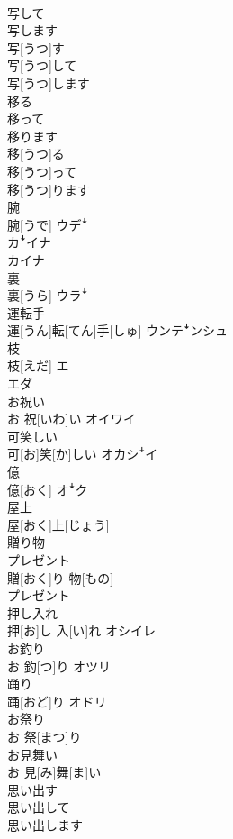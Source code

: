 \documentclass[8pt]{extreport}
\begin{document}
\begin{CJK}{UTF8}{min}
\\	写して 
\\	写します	
\\	写[うつ]す 
\\	写[うつ]して 
\\	写[うつ]します	
\\	移る 
\\	移って 
\\	移ります	
\\	移[うつ]る 
\\	移[うつ]って 
\\	移[うつ]ります	
\\	腕	
\\	腕[うで]	ウデꜜ 
\\	カꜜイナ 
\\	カイナ
\\	裏	
\\	裏[うら]	ウラꜜ
\\	運転手	
\\	運[うん]転[てん]手[しゅ]	ウンテꜜンシュ
\\	枝	
\\	枝[えだ]	エ 
\\	エダ
\\	お祝い	
\\	お 祝[いわ]い	オイワイ
\\	可笑しい	
\\	可[お]笑[か]しい	オカシꜜイ
\\	億	
\\	億[おく]	オꜜク
\\	屋上	
\\	屋[おく]上[じょう]	
\\	贈り物 
\\	プレゼント	
\\	贈[おく]り 物[もの] 
\\	プレゼント	
\\	押し入れ	
\\	押[お]し 入[い]れ	オシイレ
\\	お釣り	
\\	お 釣[つ]り	オツリ
\\	踊り	
\\	踊[おど]り	オドリ
\\	お祭り	
\\	お 祭[まつ]り	
\\	お見舞い	
\\	お 見[み]舞[ま]い	
\\	思い出す 
\\	思い出して 
\\	思い出します	

\end{CJK}
\end{document}
